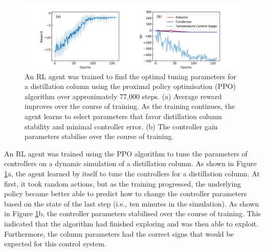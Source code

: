 \begin{figure}[tb]
  \includegraphics[width=\textwidth]{gfx/Chapter05/dis3_74_reward_parameters.png}
  \caption{An RL agent was trained to find the optimal tuning parameters for a distillation column using the proximal policy optimisation (PPO) algorithm over approximately 77,000 steps. (a) Average reward improves over the course of training. As the training continues, the agent learns to select parameters that favor distillation column stability and minimal controller error. (b) The controller gain parameters stabilise over the course of training.}
  \label{ppo_training_curve}
\end{figure}

An RL agent was trained using the PPO algorithm to tune the parameters of controllers on a dynamic simulation of a distillation column. As shown in Figure \ref{ppo_training_curve}a, the agent learned by itself to tune the controllers for a distillation column. At first, it took random actions, but as the training progressed, the underlying policy became better able to predict how to change the controller parameters based on the state of the last step (i.e., ten minutes in the simulation). As shown in Figure \ref{ppo_training_curve}b, the controller parameters stabilised over the course of training. This indicated that the algorithm had finished exploring and was then able to exploit. Furthermore, the column parameters had the correct signs that would be expected for this control system.


